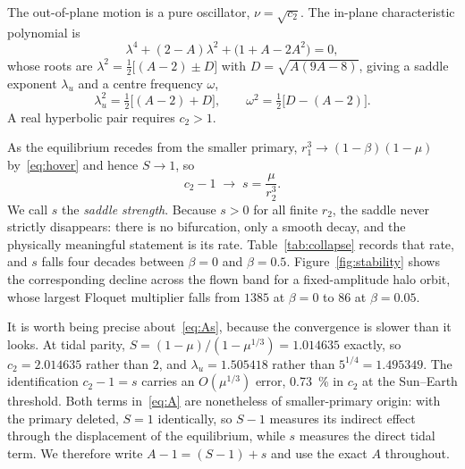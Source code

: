 \documentclass[pdflatex,sn-mathphys-num]{sn-jnl}
\begin{document}
The out-of-plane motion is a pure oscillator, $\nu=\sqrt{c_2}$. The in-plane
characteristic polynomial is
\begin{equation}
  \lambda^{4} + (2-A)\lambda^{2} + \bigl(1+A-2A^{2}\bigr) = 0 ,
  \label{eq:quartic}
\end{equation}
whose roots are $\lambda^{2}=\tfrac12\bigl[(A-2)\pm D\bigr]$ with
$D=\sqrt{A(9A-8)}$, giving a saddle exponent $\lambda_u$ and a centre frequency
$\omega$,
\begin{equation}
  \lambda_u^{2} = \tfrac12\bigl[(A-2)+D\bigr], \qquad
  \omega^{2} = \tfrac12\bigl[D-(A-2)\bigr].
  \label{eq:rates}
\end{equation}
A real hyperbolic pair requires $c_2>1$.

As the equilibrium recedes from the smaller primary, $r_1^3\to(1-\beta)(1-\mu)$
by~\eqref{eq:hover} and hence $S\to1$, so
\begin{equation}
  c_2 - 1 \;\longrightarrow\; s = \frac{\mu}{r_2^{3}} .
  \label{eq:As}
\end{equation}
We call $s$ the \emph{saddle strength}. Because $s>0$ for all finite $r_2$, the
saddle never strictly disappears: there is no bifurcation, only a smooth decay,
and the physically meaningful statement is its rate. Table~\ref{tab:collapse}
records that rate, and $s$ falls four decades between $\beta=0$ and
$\beta=0.5$. Figure~\ref{fig:stability} shows the corresponding decline across
the flown band for a fixed-amplitude halo orbit, whose largest Floquet
multiplier falls from $1385$ at $\beta=0$ to $86$ at $\beta=0.05$.

It is worth being precise about~\eqref{eq:As}, because the convergence is slower
than it looks. At tidal parity, $S=(1-\mu)/(1-\mu^{1/3})=1.014635$ exactly, so
$c_2=2.014635$ rather than $2$, and $\lambda_u=1.505418$ rather than
$5^{1/4}=1.495349$. The identification $c_2-1=s$ carries an $O(\mu^{1/3})$ error,
\SI{0.73}{\percent} in $c_2$ at the Sun--Earth threshold. Both terms
in~\eqref{eq:A} are nonetheless of smaller-primary origin: with the primary
deleted, $S=1$ identically, so $S-1$ measures its indirect effect through the
displacement of the equilibrium, while $s$ measures the direct tidal term. We
therefore write $A-1=(S-1)+s$ and use the exact $A$ throughout.
\end{document}
